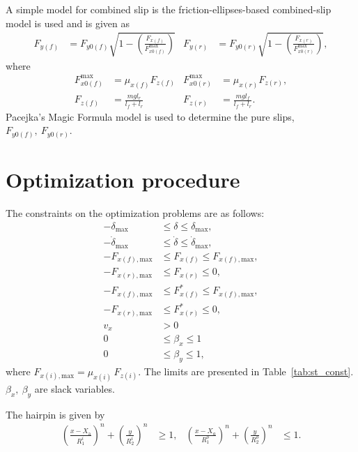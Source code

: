 A simple model for combined slip is the friction-ellipses-based combined-slip model is used and is given as
\begin{align}
    F_{y(f)} &= F_{y0(f)}\sqrt{1 - \left(\frac{F_{x(f)}}{F_{x0(f)}^{\text{max}}}\right)} & F_{y(r)} &= F_{y0(r)}\sqrt{1 - \left(\frac{F_{x(r)}}{F_{x0(r)}^{\text{max}}}\right)},
\end{align}
where 
\begin{align}
    F_{x0(f)}^{\text{max}} &= \mu_{x(f)}F_{z(f)} & F_{x0(r)}^{\text{max}} &= \mu_{x(r)}F_{z(r)},\\
    F_{z(f)} &= \frac{mgl_r}{l_f+ l_r} & F_{z(r)} &= \frac{mgl_f}{l_f+ l_r}.
\end{align}
Pacejka's Magic Formula model is used to determine the pure slips, $F_{y0(f)},\ F_{y0(r)}$.
\section{Optimization procedure}\label{sec:STcons}
The constraints on the optimization problems are as follows:
\begin{subequations}
    \begin{align}
        -\delta_{\text{max}} &\leq \delta \leq \delta_{\text{max}},\\
        -\dot\delta_{\text{max}} &\leq \dot\delta \leq \dot\delta_{\text{max}},\\
        -F_{x(f),\text{max}} &\leq F_{x(f)} \leq F_{x(f),\text{max}},\\
        -F_{x(r),\text{max}} &\leq F_{x(r)} \leq 0,\\
        -F_{x(f),\text{max}} &\leq F_{x(f)}^* \leq F_{x(f),\text{max}},\\
        -F_{x(r),\text{max}} &\leq F_{x(r)}^* \leq 0,\\
        v_x &> 0\\
        0 &\leq \beta_x \leq 1\\
        0 &\leq \beta_y \leq 1,
    \end{align}
\end{subequations}
where $F_{x(i),\text{max}} = \mu_{x(i)}\,F_{z(i)}$. The limits are presented in Table~\ref{tab:st_const}. $\beta_x,\ \beta_y$ are slack variables. 

The hairpin is given by
\begin{align}
    \left(\frac{x-X_\text{a}}{R_1^i}\right)^n + \left(\frac{y}{R_2^i}\right)^n & \geq 1, & \left(\frac{x-X_a}{R_1^o}\right)^n + \left(\frac{y}{R_2^o}\right)^n & \leq 1.
\end{align}

